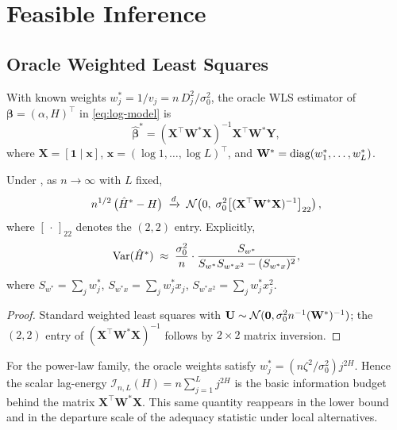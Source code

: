 \section{Feasible Inference}
\label{sec:clt}

\subsection{Oracle Weighted Least Squares}

With known weights $w_j^* = 1/v_j = n\,D_j^2/\sigma_0^2$, the oracle
WLS estimator of $\boldsymbol{\beta} = (\alpha, H)^\top$ in
\eqref{eq:log-model} is
\begin{equation}
    \boldsymbol{\hat\beta}^* = (\mathbf{X}^\top \mathbf{W}^* \mathbf{X})^{-1}
    \mathbf{X}^\top \mathbf{W}^* \mathbf{Y},
    \label{eq:oracle-wls}
\end{equation}
where $\mathbf{X} = [\mathbf{1}\mid \mathbf{x}]$, $\mathbf{x} = (\log
1, \ldots, \log L)^\top$, and $\mathbf{W}^* = \operatorname{diag}(w_1^*, \ldots, w_L^*)$.

\begin{proposition}
\label{prop:oracle-clt}
Under , as $n \to \infty$ with $L$
fixed,
\[
    n^{1/2}\,\bigl(\hat H^* - H\bigr) \;\xrightarrow{d}\; \mathcal{N}\!\left(0,\;
    \sigma_0^2 \bigl[(\mathbf{X}^\top \mathbf{W}^* \mathbf{X})^{-1}\bigr]_{22}\right),
\]
where $[\,\cdot\,]_{22}$ denotes the $(2,2)$ entry.
Explicitly,
\begin{equation}
    \mathrm{Var}(\hat H^*) \;\approx\; \frac{\sigma_0^2}{n}
    \cdot \frac{S_{w^*}}
    {S_{w^*} S_{w^* x^2} - (S_{w^* x})^2},
    \label{eq:oracle-var}
\end{equation}
where $S_{w^*} = \sum_j w_j^*$, $S_{w^* x} = \sum_j w_j^* x_j$,
$S_{w^* x^2} = \sum_j w_j^* x_j^2$.
\end{proposition}

\begin{proof}
Standard weighted least squares with $\mathbf{U} \sim
\mathcal{N}(\mathbf{0}, \sigma_0^2 n^{-1} (\mathbf{W}^*)^{-1})$; the
$(2,2)$ entry of $(\mathbf{X}^\top \mathbf{W}^* \mathbf{X})^{-1}$ follows
by $2\times 2$ matrix inversion.
\end{proof}

\begin{remark}
    For the power-law family, the oracle weights satisfy
    $w_j^* = (n\zeta^2/\sigma_0^2) j^{2H}$.  Hence the scalar lag-energy
    $\mathcal I_{n,L}(H) = n\sum_{j=1}^L j^{2H}$ is the basic information
    budget behind the matrix $\mathbf X^\top \mathbf W^* \mathbf X$.
    This same quantity reappears in the lower bound and in the departure scale
    of the adequacy statistic under local alternatives.
\end{remark}

